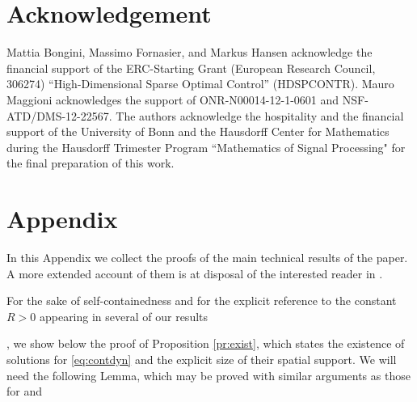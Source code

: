 \documentclass[A4paper,11pt]{article}
\theoremstyle{definition}
\begin{document}
%
%




\section*{Acknowledgement}

Mattia Bongini, Massimo Fornasier, and Markus Hansen acknowledge the financial support of the ERC-Starting Grant (European Research Council, 306274) ``High-Dimensional Sparse Optimal Control'' (HDSPCONTR). Mauro Maggioni acknowledges the support of ONR-N00014-12-1-0601 and NSF-ATD/DMS-12-22567. The authors acknowledge the hospitality and the financial support of the University of Bonn and the Hausdorff Center for Mathematics during the Hausdorff Trimester Program ``Mathematics of Signal Processing" for the final preparation of this work.


\section{Appendix}

{In this Appendix we collect the proofs of the main technical results of the paper. A more extended account of them is at disposal of the interested reader in \cite{bofohama15}. 

For the sake of self-containedness and for the explicit reference to the constant $R>0$ appearing in several of our results}, we show {below} the proof of Proposition \ref{pr:exist}, which states the existence of solutions for \eqref{eq:contdyn}  {and the explicit size of their spatial support}. We will need the following Lemma, which may be proved  {with similar arguments as} those for \cite[Lemma 6.7]{MFOC} and \cite[Lemma 4.7]{CanCarRos10}
\end{document}
